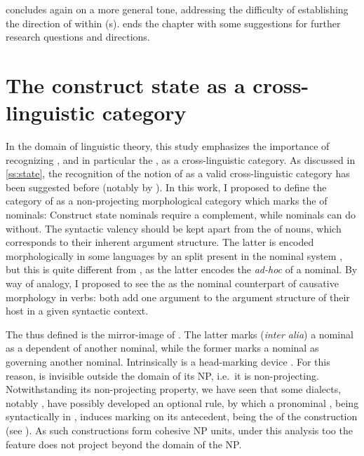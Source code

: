  concludes again on a more general tone, addressing the difficulty of establishing the direction of  within  (s).  ends the chapter with some suggestions for further research questions and directions.



\section{The construct state as a cross-linguistic category} \label{ss:cst_universal}

In the domain of linguistic theory, this study emphasizes  the importance of recognizing  , and in particular the , as a cross-linguistic category. As discussed in \ref{ss:state}, the recognition of the notion of \cst* as a valid cross-linguistic category has been suggested before (notably by \cite{CreisselsConstruct}). In this work, I proposed to define the category of   as a non-projecting morphological category which marks the  of nominals: Construct state nominals require a complement, while  nominals can do without. The {syntactic valency} should  be kept apart from the  of nouns, which corresponds to their inherent argument structure. The latter is encoded morphologically in some languages by an  split present in the  nominal system \citep[]{BickelNicholsWals58}, but this is quite different from , as the latter encodes the \emph{ad-hoc}  of a nominal. By way of analogy, I proposed to see the   as the nominal counterpart of causative morphology in verbs: both add one argument to the argument structure of their host in a given syntactic context.

The  thus defined is the mirror-image of . The latter marks (\textit{inter alia}) a nominal as a dependent of another nominal, while the former marks a nominal as governing another nominal. Intrinsically  is a head-marking device \citep[cf.][]{NicholsBickelWals}. For this reason,  is invisible outside the domain of its NP, i.e.\ it is non-projecting.  Notwithstanding its non-projecting property, we have seen that some  dialects, notably \JUrm, have possibly developed an optional  rule, by which a pronominal \lnk*, being syntactically in \cst*, induces \cst* marking on its antecedent, being the \prim of the construction (see ). As such constructions form cohesive NP units, under this analysis too the  feature does not project beyond the domain of the NP. 

